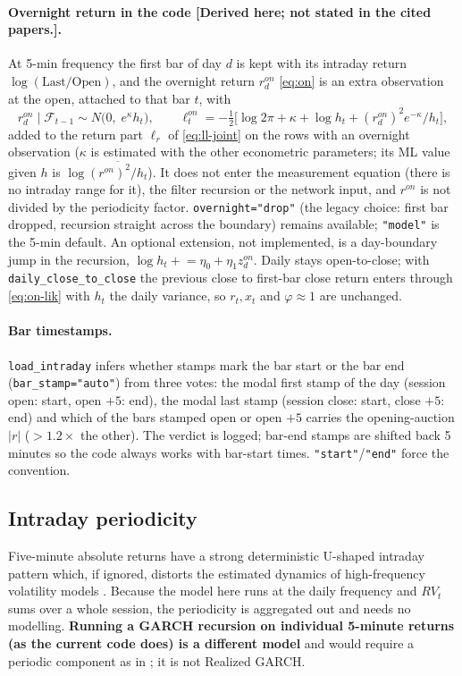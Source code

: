 \documentclass[11pt]{article}
\newcommand{\F}{\mathcal{F}}
\newcommand{\derived}{\textbf{[Derived here; not stated in the cited papers.]}}
\begin{document}
\paragraph{Overnight return in the code \derived.} At 5-min frequency the first bar of day $d$
is kept with its intraday return $\log(\text{Last}/\text{Open})$, and the overnight return
$r^{on}_d$ \eqref{eq:on} is an extra observation at the open, attached to that bar $t$, with
\begin{equation}\label{eq:on-lik}
r^{on}_d\mid\F_{t-1}\sim N\big(0,\;e^{\kappa}h_t\big),\qquad
\ell^{on}_t=-\tfrac12\big[\log2\pi+\kappa+\log h_t+(r^{on}_d)^2e^{-\kappa}/h_t\big],
\end{equation}
added to the return part $\ell_r$ of \eqref{eq:ll-joint} on the rows with an overnight
observation ($\kappa$ is estimated with the other econometric parameters; its ML value given
$h$ is $\log\overline{(r^{on})^2/h_t}$). It does not enter the measurement equation (there is
no intraday range for it), the filter recursion or the network input, and $r^{on}$ is not
divided by the periodicity factor. \texttt{overnight="drop"} (the legacy choice: first bar
dropped, recursion straight across the boundary) remains available; \texttt{"model"} is the 5-min
default. An optional extension, not implemented, is a day-boundary jump in the recursion,
$\log h_{t}\mathrel{+}=\eta_0+\eta_1 z^{on}_d$. Daily stays open-to-close; with
\texttt{daily\_close\_to\_close} the previous close to first-bar close return enters through
\eqref{eq:on-lik} with $h_t$ the daily variance, so $r_t,x_t$ and $\varphi\approx1$ are unchanged.

\paragraph{Bar timestamps.} \texttt{load\_intraday} infers whether stamps mark the bar start or
the bar end (\texttt{bar\_stamp="auto"}) from three votes: the modal first stamp of the day
(session open: start, open $+5$: end), the modal last stamp (session close: start, close
$+5$: end) and which of the bars stamped open or open $+5$ carries the opening-auction $|r|$
($>1.2\times$ the other). The verdict is logged; bar-end stamps are shifted back 5 minutes so
the code always works with bar-start times. \texttt{"start"}/\texttt{"end"} force the convention.

\subsection{Intraday periodicity}
Five-minute absolute returns have a strong deterministic U-shaped intraday pattern which, if
ignored, distorts the estimated dynamics of high-frequency volatility models
\cite{AB1997}. Because the model here runs at the daily frequency and $RV_t$ sums over a
whole session, the periodicity is aggregated out and needs no modelling. \textbf{Running a
GARCH recursion on individual 5-minute returns (as the current code does) is a different
model} and would require a periodic component as in \cite{AB1997}; it is not Realized GARCH.
\end{document}
